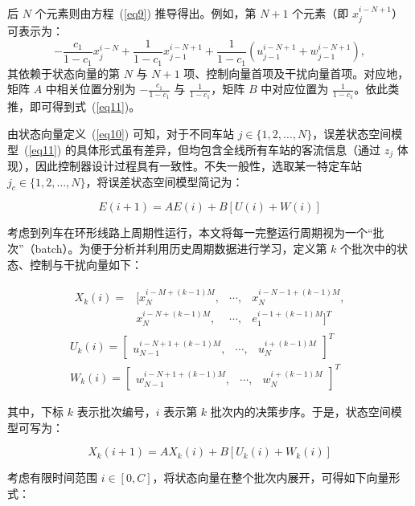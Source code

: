 后 $N$ 个元素则由方程~(\ref{eq9}) 推导得出。例如，第 $N+1$ 个元素（即 $x_j^{i-N+1}$）可表示为：
\[
-\frac{c_1}{1-c_1}x_j^{i-N} + \frac{1}{1-c_1}x_{j-1}^{i-N+1} + \frac{1}{1-c_1}(u_{j-1}^{i-N+1} + w_{j-1}^{i-N+1}),
\]
其依赖于状态向量的第 $N$ 与 $N+1$ 项、控制向量首项及干扰向量首项。对应地，矩阵 $A$ 中相关位置分别为 $-\frac{c_1}{1-c_1}$ 与 $\frac{1}{1-c_1}$，矩阵 $B$ 中对应位置为 $\frac{1}{1-c_1}$。依此类推，即可得到式~(\ref{eq11})。

由状态向量定义~(\ref{eq10}) 可知，对于不同车站 $j \in \{1,2,\ldots,N\}$，误差状态空间模型~(\ref{eq11}) 的具体形式虽有差异，但均包含全线所有车站的客流信息（通过 $z_j$ 体现），因此控制器设计过程具有一致性。不失一般性，选取某一特定车站 $j_c \in \{1,2,\ldots,N\}$，将误差状态空间模型简记为：

\begin{equation} 
	E(i+1)=A E(i)+B\left[U(i)+W(i)\right]
	\label{eq12}
\end{equation}

考虑到列车在环形线路上周期性运行，本文将每一完整运行周期视为一个“批次”（batch）。为便于分析并利用历史周期数据进行学习，定义第 $k$ 个批次中的状态、控制与干扰向量如下：

\begin{equation}
\begin{gathered}
\begin{array}{llll}
X_k(i)=&[x_N^{i-M+(k-1) M}, & \cdots, & x_N^{i-N-1+(k-1) M},\\
&x_N^{i-N+(k-1) M}, & \cdots, & e_1^{i-1+(k-1) M}]^T
\end{array} \\
U_k(i)=\left[\begin{array}{lll}
u_{N-1}^{i-N+1+(k-1) M}, & \cdots, & u_N^{i+(k-1) M}
\end{array}\right]^T \\
W_k(i)=\left[\begin{array}{lll}
w_{N-1}^{i-N+1+(k-1) M}, & \cdots, & w_N^{i+(k-1) M}
\end{array}\right]^T
\end{gathered}
\label{eq13}
\end{equation}

其中，下标 $k$ 表示批次编号，$i$ 表示第 $k$ 批次内的决策步序。于是，状态空间模型可写为：

\begin{equation}
X_k(i+1)=A X_k(i)+B\left[U_k(i)+W_k(i)\right]
\label{eq14}
\end{equation}

考虑有限时间范围 $i \in [0, C]$，将状态向量在整个批次内展开，可得如下向量形式：

